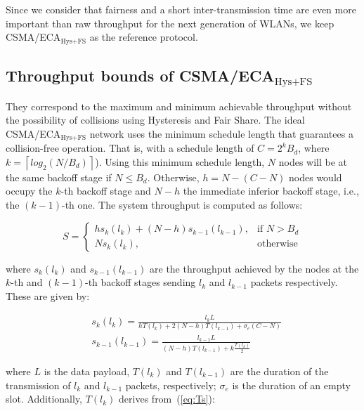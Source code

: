\documentclass[a4paper,journal]{IEEEtran}
\begin{document}
	Since we consider that fairness and a short inter-transmission time are even more important than raw throughput for the next generation of WLANs, we keep CSMA/ECA$_{\text{Hys+FS}}$ as the reference protocol.
	
	\subsection{Throughput bounds of CSMA/ECA$_{\text{Hys+FS}}$}\label{ECA-bounds}
	
	They correspond to the maximum and minimum achievable throughput without the possibility of collisions using Hysteresis and Fair Share. The ideal CSMA/ECA$_{\text{Hys+FS}}$ network uses the minimum schedule length that guarantees a collision-free operation. That is, with a schedule length of $C=2^{k}B_{d}$, where $k = \left\lceil log_{2}(N/B_{d})\right\rceil$). Using this minimum schedule length, $N$ nodes will be at the same backoff stage if $N\leq B_{d}$. Otherwise, $h = N-(C-N)$ nodes would occupy the $k$-th backoff stage and $N-h$ the immediate inferior backoff stage, i.e., the $(k-1)$-th one. The system throughput is computed as follows:
	
	\begin{equation}
			S =
				\begin{cases}\label{eq:bound}
					hs_{k}(l_{k}) + (N-h)s_{k-1}(l_{k-1}), & \text{if } N > B_{d} \\
					Ns_{k}(l_{k}), & \text{otherwise}
				\end{cases}
	\end{equation}
	
	where $s_{k}(l_{k})$ and $s_{k-1}(l_{k-1})$ are the throughput achieved by the nodes at the $k$-th and $(k-1)$-th backoff stages sending $l_{k}$ and $l_{k-1}$ packets respectively. These are given by:
	
	\begin{subequations}
		\begin{align}
			&s_{k}(l_{k}) = \frac{l_{k} L}{hT(l_{k})+2(N-h)T(l_{k-1}) + \sigma_{e}(C - N)}\label{eq:HighNodes}\\
			&s_{k-1}(l_{k-1}) = \frac{l_{k-1} L}{(N-h)T(l_{k-1}) + k\frac{T(l_{k})}{2}}\label{eq:LowNodes}
		\end{align}
	\end{subequations}
	
	where $L$ is the data payload, $T(l_{k})$ and $T(l_{k-1})$ are the duration of the transmission of $l_{k}$ and $l_{k-1}$ packets, respectively; $\sigma_{e}$ is the duration of an empty slot. Additionally, $T(l_{k})$ derives from~(\ref{eq:Ts}):
	
\end{document}
